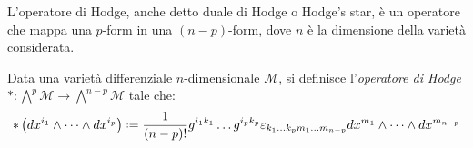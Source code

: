 L'operatore di Hodge, anche detto duale di Hodge o Hodge's star, è un operatore che mappa una $ p $-form in una $ (n - p) $-form, dove $ n $ è la dimensione della varietà considerata.
\begin{definition}
	Data una varietà differenziale $ n $-dimensionale $ \mathcal{M} $, si definisce l'\textit{operatore di Hodge} $ * : \bigwedge^p \mathcal{M} \rightarrow \bigwedge^{n - p} \mathcal{M} $ tale che:
	\begin{equation}
		* \left( dx^{i_1} \wedge \dots \wedge dx^{i_p} \right) \defeq \frac{1}{(n - p)!} g^{i_1 k_1} \dots g^{i_p k_p} \varepsilon_{k_1 \dots k_p m_1 \dots m_{n - p}} dx^{m_1} \wedge \dots \wedge dx^{m_{n - p}}
		\label{eq:3.18}
	\end{equation}
\end{definition}

